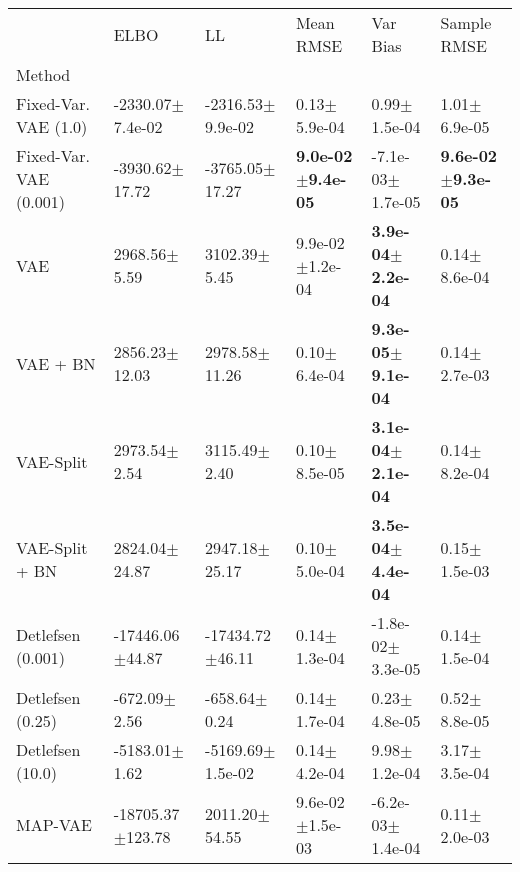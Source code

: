 \begin{tabular}{llllll}
\toprule
{} &                       ELBO &                         LL &                     Mean RMSE &                       Var Bias &                   Sample RMSE \\
Method                 &                            &                            &                               &                                &                               \\
\midrule
Fixed-Var. VAE (1.0)   &       -2330.07$\pm$7.4e-02 &       -2316.53$\pm$9.9e-02 &              0.13$\pm$5.9e-04 &               0.99$\pm$1.5e-04 &              1.01$\pm$6.9e-05 \\
Fixed-Var. VAE (0.001) &         -3930.62$\pm$17.72 &         -3765.05$\pm$17.27 &  \textbf{9.0e-02$\pm$9.4e-05} &           -7.1e-03$\pm$1.7e-05 &  \textbf{9.6e-02$\pm$9.3e-05} \\
VAE                    &           2968.56$\pm$5.59 &           3102.39$\pm$5.45 &           9.9e-02$\pm$1.2e-04 &   \textbf{3.9e-04$\pm$2.2e-04} &              0.14$\pm$8.6e-04 \\
VAE + BN               &          2856.23$\pm$12.03 &          2978.58$\pm$11.26 &              0.10$\pm$6.4e-04 &   \textbf{9.3e-05$\pm$9.1e-04} &              0.14$\pm$2.7e-03 \\
VAE-Split              &           2973.54$\pm$2.54 &           3115.49$\pm$2.40 &              0.10$\pm$8.5e-05 &   \textbf{3.1e-04$\pm$2.1e-04} &              0.14$\pm$8.2e-04 \\
VAE-Split + BN         &          2824.04$\pm$24.87 &          2947.18$\pm$25.17 &              0.10$\pm$5.0e-04 &   \textbf{3.5e-04$\pm$4.4e-04} &              0.15$\pm$1.5e-03 \\
Detlefsen (0.001)      &        -17446.06$\pm$44.87 &        -17434.72$\pm$46.11 &              0.14$\pm$1.3e-04 &           -1.8e-02$\pm$3.3e-05 &              0.14$\pm$1.5e-04 \\
Detlefsen (0.25)       &           -672.09$\pm$2.56 &           -658.64$\pm$0.24 &              0.14$\pm$1.7e-04 &               0.23$\pm$4.8e-05 &              0.52$\pm$8.8e-05 \\
Detlefsen (10.0)       &          -5183.01$\pm$1.62 &       -5169.69$\pm$1.5e-02 &              0.14$\pm$4.2e-04 &               9.98$\pm$1.2e-04 &              3.17$\pm$3.5e-04 \\
MAP-VAE                &       -18705.37$\pm$123.78 &          2011.20$\pm$54.55 &           9.6e-02$\pm$1.5e-03 &           -6.2e-03$\pm$1.4e-04 &              0.11$\pm$2.0e-03 \\

\end{tabular}
